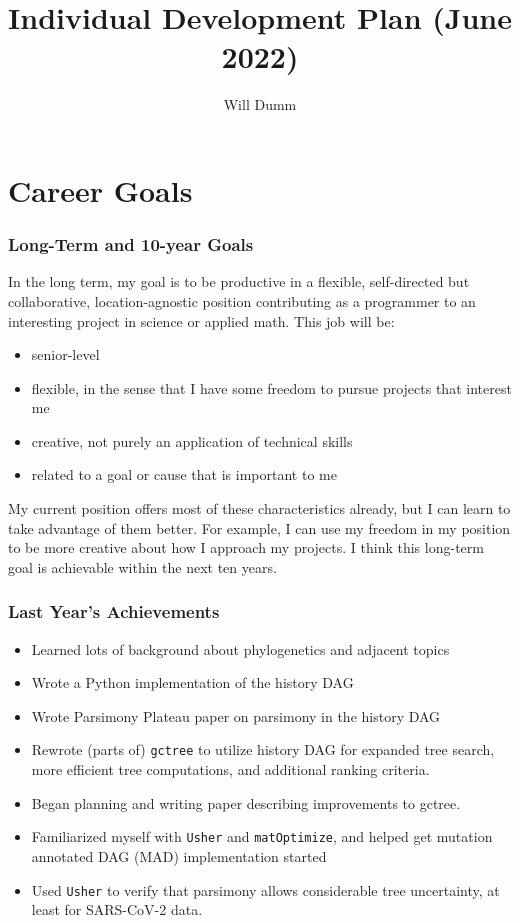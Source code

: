 \documentclass{paper}
\title{Individual Development Plan (June 2022)}
\author{Will Dumm}
\begin{document}
\maketitle


\section*{Career Goals}

\subsubsection*{Long-Term and 10-year Goals}
In the long term, my goal is to be productive in a flexible, self-directed but collaborative, location-agnostic position contributing as a programmer to an interesting project in science or applied math.
This job will be:
\begin{itemize}
    \item senior-level
    \item flexible, in the sense that I have some freedom to pursue projects that interest me
    \item creative, not purely an application of technical skills
    \item related to a goal or cause that is important to me
\end{itemize}
My current position offers most of these characteristics already, but I can learn to take advantage of them better. For example, I can use my freedom in my position to be more creative about how I approach my projects.
I think this long-term goal is achievable within the next ten years.

\subsubsection*{Last Year's Achievements}
\begin{itemize}
    \item Learned lots of background about phylogenetics and adjacent topics
    \item Wrote a Python implementation of the history DAG
    \item Wrote Parsimony Plateau paper on parsimony in the history DAG
    \item Rewrote (parts of) \texttt{gctree} to utilize history DAG for expanded tree search, more efficient tree computations, and additional ranking criteria.
    \item Began planning and writing paper describing improvements to gctree.
    \item Familiarized myself with \texttt{Usher} and \texttt{matOptimize}, and helped get mutation annotated DAG (MAD) implementation started
    \item Used \texttt{Usher} to verify that parsimony allows considerable tree uncertainty, at least for SARS-CoV-2 data.
\end{itemize}
\end{document}
